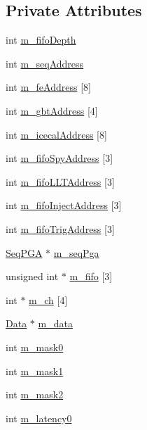 \subsection*{Private Attributes}
\begin{DoxyCompactItemize}
\item 
int \hyperlink{classFEB__v1_a30473bcdd8f018ad5dac728f6779df9c}{m\_\-fifoDepth}
\item 
int \hyperlink{classFEB__v1_a1c1eb093fd1733b9510fcf8bc5c7ad08}{m\_\-seqAddress}
\item 
int \hyperlink{classFEB__v1_a4e1945c2d5b434125f375e9d0fc6d99f}{m\_\-feAddress} \mbox{[}8\mbox{]}
\item 
int \hyperlink{classFEB__v1_ac625855df976f16694178f1a4c0eef1e}{m\_\-gbtAddress} \mbox{[}4\mbox{]}
\item 
int \hyperlink{classFEB__v1_adf21041831669e75283dd2a88fbaddf5}{m\_\-icecalAddress} \mbox{[}8\mbox{]}
\item 
int \hyperlink{classFEB__v1_a15b48648ba4534e732376b68bddc5d34}{m\_\-fifoSpyAddress} \mbox{[}3\mbox{]}
\item 
int \hyperlink{classFEB__v1_a68be75ba59d1c551163a9596dc1d235a}{m\_\-fifoLLTAddress} \mbox{[}3\mbox{]}
\item 
int \hyperlink{classFEB__v1_afd035f292061e1823ed64471bb0228ef}{m\_\-fifoInjectAddress} \mbox{[}3\mbox{]}
\item 
int \hyperlink{classFEB__v1_ad41f8756c4e15815c6d5e35902cf2257}{m\_\-fifoTrigAddress} \mbox{[}3\mbox{]}
\item 
\hyperlink{classSeqPGA}{SeqPGA} $\ast$ \hyperlink{classFEB__v1_a6c7804ac86796f233a8393043adf2e77}{m\_\-seqPga}
\item 
unsigned int $\ast$ \hyperlink{classFEB__v1_ae5b770f2f5ffb97324862c93e3153985}{m\_\-fifo} \mbox{[}3\mbox{]}
\item 
int $\ast$ \hyperlink{classFEB__v1_a383c35f10769b16c6a719494594899c6}{m\_\-ch} \mbox{[}4\mbox{]}
\item 
\hyperlink{classData}{Data} $\ast$ \hyperlink{classFEB__v1_a1c9dbc3660021dba1f58666d0097abb0}{m\_\-data}
\item 
int \hyperlink{classFEB__v1_ab49d6a271bdfddd9c7fac9435e4e686d}{m\_\-mask0}
\item 
int \hyperlink{classFEB__v1_a1cbadb02155e2defdff6d6c8f70eb945}{m\_\-mask1}
\item 
int \hyperlink{classFEB__v1_a25f03f6de00618dd575fc1f77a9af9ee}{m\_\-mask2}
\item 
int \hyperlink{classFEB__v1_a23a3d8bfbf96490890140f13b08a02c1}{m\_\-latency0}

\end{DoxyCompactItemize}
